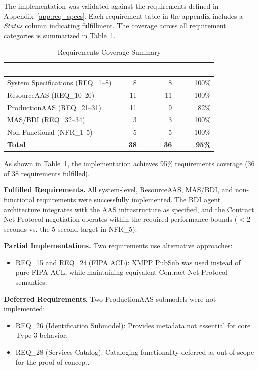 The implementation was validated against the requirements defined in Appendix~\ref{app:req_specs}. Each requirement table in the appendix includes a \textit{Status} column indicating fulfillment. The coverage across all requirement categories is summarized in Table~\ref{tab:req_coverage_summary}.

\begin{table}[ht]
\centering
\caption{Requirements Coverage Summary}
\label{tab:req_coverage_summary}
\begin{tabular}{lrrr}
\toprule
\rowcolor{headerblue}
\textcolor{white}{Category} & \textcolor{white}{Total} & \textcolor{white}{Fulfilled} & \textcolor{white}{Coverage} \\
\midrule
System Specifications (REQ\_1--8) & 8 & 8 & 100\% \\
ResourceAAS (REQ\_10--20) & 11 & 11 & 100\% \\
ProductionAAS (REQ\_21--31) & 11 & 9 & 82\% \\
MAS/BDI (REQ\_32--34) & 3 & 3 & 100\% \\
Non-Functional (NFR\_1--5) & 5 & 5 & 100\% \\
\midrule
\textbf{Total} & \textbf{38} & \textbf{36} & \textbf{95\%} \\
\bottomrule
\end{tabular}
\end{table}

As shown in Table~\ref{tab:req_coverage_summary}, the implementation achieves 95\% requirements coverage (36 of 38 requirements fulfilled).

\textbf{Fulfilled Requirements.} All system-level, ResourceAAS, MAS/BDI, and non-functional requirements were successfully implemented. The \ac{BDI} agent architecture integrates with the \ac{AAS} infrastructure as specified, and the Contract Net Protocol negotiation operates within the required performance bounds ($<$2 seconds vs. the 5-second target in NFR\_5).

\textbf{Partial Implementations.} Two requirements use alternative approaches:
\begin{itemize}
    \item REQ\_15 and REQ\_24 (FIPA ACL): XMPP PubSub was used instead of pure FIPA ACL, while maintaining equivalent Contract Net Protocol semantics.
\end{itemize}

\textbf{Deferred Requirements.} Two ProductionAAS submodels were not implemented:
\begin{itemize}
    \item REQ\_26 (Identification Submodel): Provides metadata not essential for core Type 3 behavior.
    \item REQ\_28 (Services Catalog): Cataloging functionality deferred as out of scope for the proof-of-concept.
\end{itemize}

